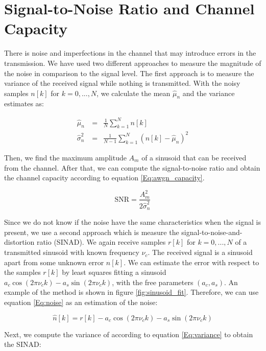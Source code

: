 \documentclass[12pt,a4paper,openright]{report}
\begin{document}
\section{Signal-to-Noise Ratio and Channel Capacity}
\label{sec:SNRmethods}
There is noise and imperfections in the channel that may introduce errors in the transmission. We have used two different approaches to measure the magnitude of the noise in comparison to the signal level. The first approach is to measure the variance of the received signal while nothing is transmitted. With the noisy samples \(n[k]\) for \(k=0,... ,N\), we calculate the mean \(\hat\mu_n\) and  the variance estimates as:

\begin{eqnarray}
                    \hat\mu_n\ & = & \frac{1}{N}\sum_{k=1}^N n[k]\\
\label{Eq:variance} \hat\sigma_n^2 & = & \frac{1}{N-1}\sum_{k=1}^N(n[k]-\hat\mu_n)^2 
\end{eqnarray}

Then, we find the maximum amplitude \(A_{m}\) of a sinusoid that can be received from the channel. After that,  we can compute the signal-to-noise ratio and obtain the channel capacity according to equation \ref{Eq:awgn_capacity}.

\begin{equation}\label{Eq:snr} \text{SNR} = \frac{A_{m}^2}{2 \hat\sigma_n^2} \end{equation}

Since we do not know if the noise have the same characteristics when the signal is present, we use a second approach which is measure the signal-to-noise-and-distortion ratio (SINAD). We again receive samples \(r[k]\) for \(k=0,... ,N\)  of a transmitted sinusoid with known frequency \(\nu_c\). The received signal is a sinusoid apart from some unknown error \(n[k]\). We can estimate the error with respect to the samples \(r[k]\) by least squares fitting a sinusoid \(a_c \cos(2\pi\nu_ck) - a_s \sin(2\pi\nu_ck)\), with the free parameters \((a_c,a_s)\). An example of the method is shown in figure \ref{fig:sinusoid_fit}. Therefore, we can use equation \ref{Eq:noise} as an estimation of the noise:

\begin{equation}\label{Eq:noise} \hat n[k] = r[k] - a_c \cos(2\pi\nu_ck) - a_s \sin(2\pi\nu_ck)\end{equation}

Next, we compute the variance of according to equation \eqref{Eq:variance} to obtain the SINAD:
\end{document}
